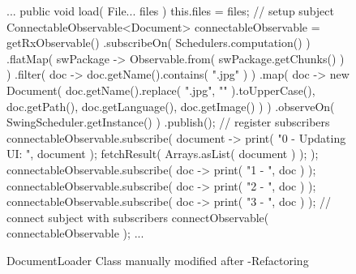 \begin{figure}[H]
\begin{sourcecode}
\begin{javacode}{}
...
	public void load( File... files ) {
		this.files = files;
		// setup subject
		ConnectableObservable<Document> connectableObservable = getRxObservable()
				.subscribeOn( Schedulers.computation() )
				.flatMap( swPackage -> Observable.from( swPackage.getChunks() ) )
				.filter( doc -> doc.getName().contains( ".jpg" ) )
				.map( doc -> new Document(
						doc.getName().replace( ".jpg", "" ).toUpperCase(),
						doc.getPath(),
						doc.getLanguage(),
						doc.getImage() ) )
				.observeOn( SwingScheduler.getInstance() )
				.publish();
		// register subscribers
		connectableObservable.subscribe( document -> {
			print( "0 - Updating UI: ", document );
			fetchResult( Arrays.asList( document ) );
		} );
		connectableObservable.subscribe( doc -> print( "1 - ", doc ) );
		connectableObservable.subscribe( doc -> print( "2 - ", doc ) );
		connectableObservable.subscribe( doc -> print( "3 - ", doc ) );
		// connect subject with subscribers
		connectObservable( connectableObservable );
	}
...
\end{javacode}
\caption{DocumentLoader Class manually modified after \toolextension{}-Refactoring}
\label{code:example-edited}
\end{sourcecode}
\end{figure}
